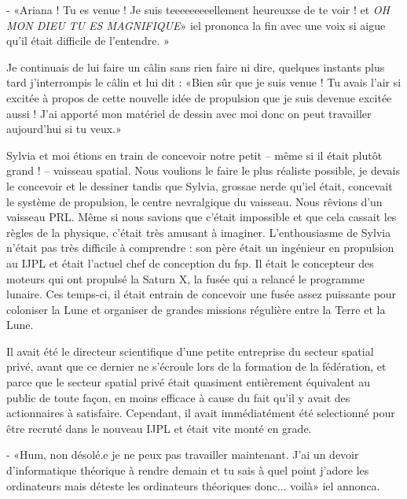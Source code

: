 \documentclass[12pt,colorlinks,a4paper]{book}
\renewcommand{\cdot}{\textperiodcentered}
\begin{document}
\bigskip

- «Ariana ! Tu es venue ! Je suis teeeeeeeeellement heureux\cdot se de
te voir ! et \textit{OH MON DIEU TU ES MAGNIFIQUE}» iel prononca
la fin avec une voix si aigue qu'il était difficile de l'entendre.
»

\bigskip

Je continuais de lui faire un câlin sans rien faire ni dire, quelques
instants plus tard j'interrompis le câlin et lui dit : «Bien sûr
que je suis venue ! Tu avais l'air si excité\cdot e à propos de cette nouvelle
idée de propulsion que je suis devenue excitée aussi ! J'ai apporté
mon matériel de dessin avec moi donc on peut travailler aujourd'hui
si tu veux.»

\bigskip

Sylvia et moi étions en train de concevoir notre petit -- même si
il était plutôt grand ! -- vaisseau spatial. Nous voulions le faire
le plus réaliste possible, je devais le concevoir et le dessiner tandis
que Sylvia, grossae nerd\cdot e qu'iel était, concevait le système de propulsion,
le centre nevralgique du vaisseau. Nous rêvions d'un vaisseau PRL.
Même si nous savions que c'était impossible et que cela cassait les
règles de la physique, c'était très amusant à imaginer. L'enthousiasme
de Sylvia n'était pas très difficile à comprendre : son père était
un ingénieur en propulsion au IJPL et était l'actuel chef de conception
du \gls{fsp}. Il était le concepteur des moteurs qui ont propulsé
la Saturn X, la fusée qui a relancé le programme lunaire. Ces temps-ci,
il était entrain de concevoir une fusée assez puissante pour coloniser
la Lune et organiser de grandes missions régulière entre la Terre
et la Lune.

\bigskip

Il avait été le directeur scientifique d'une petite entreprise du
secteur spatial privé, avant que ce dernier ne s'écroule lors de la
formation de la fédération, et parce que le secteur spatial privé
était quasiment entièrement équivalent au public de toute façon, en
moins efficace à cause du fait qu'il y avait des actionnaires à satisfaire.
Cependant, il avait immédiatément été selectionné pour être recruté
dans le nouveau IJPL et était vite monté en grade.

\bigskip

- «Hum, non désolé.e je ne peux pas travailler maintenant. J'ai
un devoir d'informatique théorique à rendre demain et tu sais à quel
point j'adore les ordinateurs mais déteste les ordinateurs théoriques
donc... voilà» iel annonca. 
\end{document}
